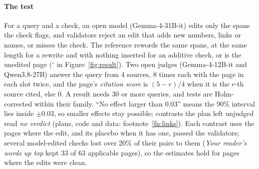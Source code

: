 \paragraph{The test}
For a query and a check, an open model (Gemma-4-31B-it) edits only the spans the check flags, and validators reject an edit that adds new numbers, links or names, or misses the check.
The reference rewords the same spans, at the same length for a rewrite and with nothing inserted for an additive check, or is the unedited page ($^{\circ}$ in Figure~\ref{fig:result}).
Two open judges (Gemma-4-12B-it and Qwen3.8-27B) answer the query from 4 sources, 8 times each with the page in each slot twice, and the page's \emph{citation score} is $(5-r)/4$ when it is the $r$-th source cited, else 0.
A result needs 30 or more queries, and tests are Holm-corrected within their family.
``No effect larger than 0.03'' means the 90\% interval lies inside $\pm 0.03$, so smaller effects stay possible; contrasts the plan left unjudged read \emph{no verdict} (plans, code and data: footnote~\ref{fn:links}).
Each contrast uses the pages where the edit, and its placebo when it has one, passed the validators; several model-edited checks lost over 20\% of their pairs to them (\emph{Your reader's words up top} kept 33 of 63 applicable pages), so the estimates hold for pages where the edits were clean.

